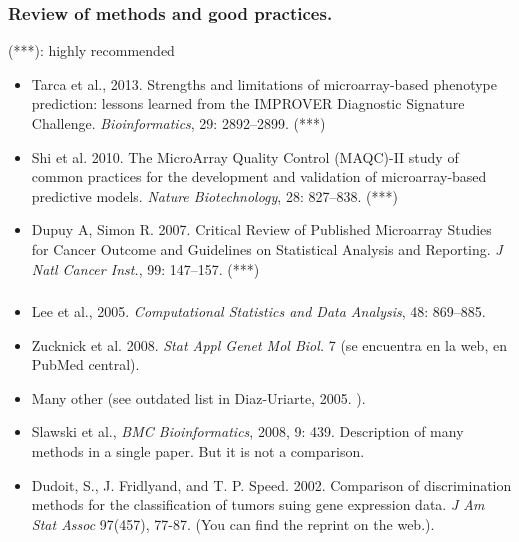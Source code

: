 \begin{frame}
\frametitle{Review of methods and good practices.}

(***): highly recommended
\begin{itemize}
  
\item Tarca et al., 2013.   Strengths and limitations of microarray-based
  phenotype prediction: lessons learned from the IMPROVER Diagnostic
  Signature Challenge. \textit{Bioinformatics}, 29: 2892--2899. (***)
\item Shi et al. 2010. The MicroArray Quality Control (MAQC)-II study of
  common practices for the development and validation of microarray-based
  predictive models. \textit{Nature Biotechnology}, 28: 827--838. (***)

  
\item   Dupuy A, Simon R. 2007. Critical Review of Published Microarray Studies
  for Cancer Outcome and Guidelines on Statistical Analysis and
  Reporting. \textit{J Natl Cancer Inst.}, 99: 147--157.  (***)
\end{itemize}
\end{frame}




\begin{frame}
\frametitle{}
\begin{itemize}
  \item Lee et al., 2005. \textit{Computational Statistics and Data
    Analysis}, 48: 869--885.
  
\item Zucknick et al. 2008. \textit{Stat Appl Genet Mol Biol.} 7 (se
  encuentra en la web, en PubMed central). 

\item Many other (see outdated list in Diaz-Uriarte, 2005.
  ).
\item Slawski et al., \textit{BMC Bioinformatics}, 2008, 9:
  439. Description of many methods in a single paper. But it is not a comparison.

\item Dudoit, S., J. Fridlyand, and T. P. Speed. 2002.
    Comparison of discrimination methods for the classification of tumors suing gene expression data.
    \textit{J Am Stat Assoc} 97(457), 77-87. (You can find the reprint on
    the web.).

\end{itemize}
\end{frame}





